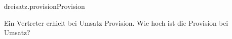 \begin{exercise}{dreisatz.provision}{Provision}
  \ifproblem\problem\par
    Ein Vertreter erhielt bei  Umsatz  Provision.
    Wie hoch ist die Provision bei  Umsatz?
  \fi
\end{exercise}
